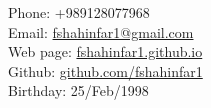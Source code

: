 { %
\noindent
Phone: +989128077968 \\
Email: \href{mailto:fshahinfar1@gmail.com}{fshahinfar1@gmail.com} \\
Web page: \href{fshahinfar1.github.io}{fshahinfar1.github.io} \\
Github: \href{https://github.com/fshahinfar1}{github.com/fshahinfar1} \\
Birthday: 25/Feb/1998 \\
}

